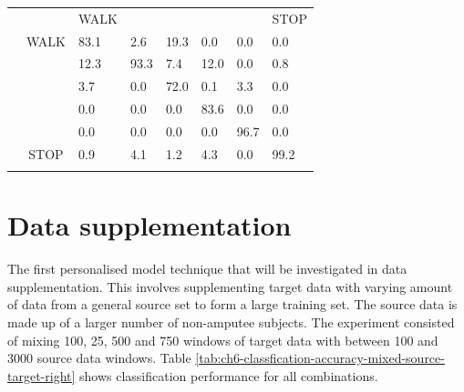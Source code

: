 \begin{table}[hbt]
\begin{subtable}{\textwidth}
\begin{tabularx}{\textwidth}{ccYYYYYY}
         \hline
         & & WALK &  &  &  &  & STOP \\
         & WALK               & 83.1 & 2.6 & 19.3 & 0.0 & 0.0 & 0.0 \\
         &  & 12.3 & 93.3 & 7.4 & 12.0 & 0.0 & 0.8 \\
         &  & 3.7 & 0.0 & 72.0 & 0.1 & 3.3 & 0.0 \\
         &  & 0.0 & 0.0 & 0.0 & 83.6 & 0.0 & 0.0 \\
         &  & 0.0 & 0.0 & 0.0 & 0.0 & 96.7 & 0.0 \\
         & STOP               & 0.9 & 4.1 & 1.2 & 4.3 & 0.0 & 99.2 \\
          \\
    \end{tabularx}
    \end{subtable}
\end{table}

\section{Data supplementation} %
\label{sec:amputee-supplementation}
The first personalised model technique that will be investigated in data supplementation. This involves supplementing target data with varying amount of data from a general source set to form a large training set. The source data is made up of a larger number of non-amputee subjects. The experiment consisted of mixing 100, 25, 500 and 750 windows of target data with between 100 and 3000 source data windows. Table \ref{tab:ch6-classfication-accuracy-mixed-source-target-right} shows classification performance for all combinations.

